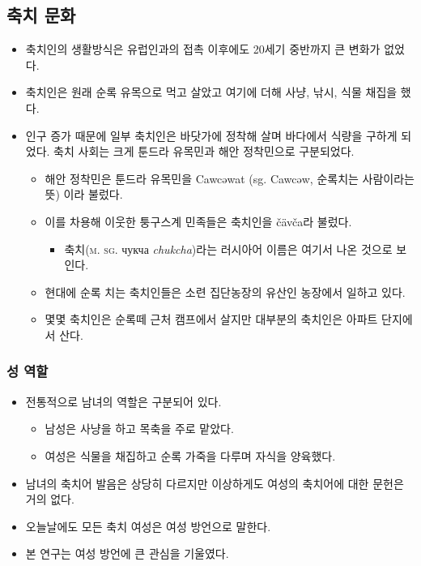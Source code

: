 \subsection{축치 문화}
\begin{itemize}
\item 축치인의 생활방식은 유럽인과의 접촉 이후에도 20세기 중반까지 큰 변화가 없었다. 
\item 축치인은 원래 순록 유목으로 먹고 살았고 여기에 더해 사냥, 낚시, 식물 채집을 했다. 
\item 인구 증가 때문에 일부 축치인은 바닷가에 정착해 살며 바다에서 식량을 구하게 되었다. 축치 사회는 크게 툰드라 유목민과 해안 정착민으로 구분되었다. 
\begin{itemize}
\item 해안 정착민은 툰드라 유목민을 Cawcəwat (sg. Cawcəw, 순록치는 사람이라는 뜻) 이라 불렀다. 
\item 이를 차용해 이웃한 퉁구스계 민족들은 축치인을 čävča라 불렀다. 
\begin{itemize}
\item 축치(\textsc{m. sg.} чукча \textit{chukcha})라는 러시아어 이름은 여기서 나온 것으로 보인다.
\end{itemize}
\item 현대에 순록 치는 축치인들은 소련 집단농장의 유산인 농장에서 일하고 있다. 
\item 몇몇 축치인은 순록떼 근처 캠프에서 살지만 대부분의 축치인은 아파트 단지에서 산다.
\end{itemize}
\end{itemize}

\subsubsection{성 역할}
\begin{itemize}
\item 전통적으로 남녀의 역할은 구분되어 있다.
\begin{itemize}
\item 남성은 사냥을 하고 목축을 주로 맡았다. 
\item 여성은 식물을 채집하고 순록 가죽을 다루며 자식을 양육했다.
\end{itemize}
\item 남녀의 축치어 발음은 상당히 다르지만 이상하게도 여성의 축치어에 대한 문헌은 거의 없다.
\item 오늘날에도 모든 축치 여성은 여성 방언으로 말한다.
\item 본 연구는 여성 방언에 큰 관심을 기울였다.
\end{itemize}

